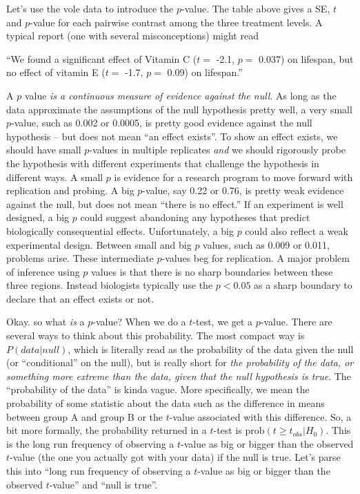 \documentclass[]{book}
\begin{document}
Let's use the vole data to introduce the \(p\)-value. The table above
gives a SE, \(t\) and \(p\)-value for each pairwise contrast among the
three treatment levels. A typical report (one with several
misconceptions) might read

``We found a significant effect of Vitamin C (\(t=\) -2.1, \(p=\) 0.037)
on lifespan, but no effect of vitamin E (\(t=\) -1.7, \(p=\) 0.09) on
lifespan.''

A \(p\) value \emph{is a continuous measure of evidence against the
null}. As long as the data approximate the assumptions of the null
hypothesis pretty well, a very small \(p\)-value, such as 0.002 or
0.0005, is pretty good evidence against the null hypothesis -- but does
not mean ``an effect exists''. To show an effect exists, we should have
small \(p\)-values in multiple replicates \emph{and} we should
rigorously probe the hypothesis with different experiments that
challenge the hypothesis in different ways. A small \(p\) is evidence
for a research program to move forward with replication and probing. A
big \(p\)-value, say 0.22 or 0.76, is pretty weak evidence against the
null, but does not mean ``there is no effect.'' If an experiment is well
designed, a big \(p\) could suggest abandoning any hypotheses that
predict biologically consequential effects. Unfortunately, a big \(p\)
could also reflect a weak experimental design. Between small and big
\(p\) values, such as 0.009 or 0.011, problems arise. These intermediate
\(p\)-values beg for replication. A major problem of inference using
\(p\) values is that there is no sharp boundaries between these three
regions. Instead biologists typically use the \(p < 0.05\) as a sharp
boundary to declare that an effect exists or not.

Okay. so what \emph{is} a \(p\)-value? When we do a \(t\)-test, we get a
\(p\)-value. There are several ways to think about this probability. The
most compact way is \(P(data | null)\), which is literally read as the
probability of the data given the null (or ``conditional'' on the null),
but is really short for \emph{the probability of the data, or something
more extreme than the data, given that the null hypothesis is true}. The
``probability of the data'' is kinda vague. More specifically, we mean
the probability of some statistic about the data such as the difference
in means between group A and group B or the \(t\)-value associated with
this difference. So, a bit more formally, the probability returned in a
\(t\)-test is \(\mathrm{prob}(t \ge t_{obs} | H_0)\). This is the long
run frequency of observing a \(t\)-value as big or bigger than the
observed \(t\)-value (the one you actually got with your data) if the
null is true. Let's parse this into ``long run frequency of observing a
\(t\)-value as big or bigger than the observed \(t\)-value'' and ``null
is true''.
\end{document}
